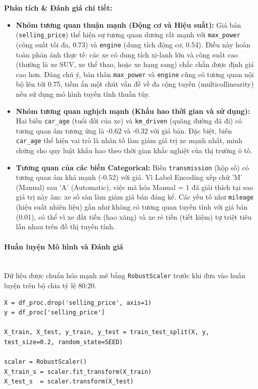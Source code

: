 \textbf{Phân tích \& Đánh giá chi tiết:}
\begin{itemize}
    \item \textbf{Nhóm tương quan thuận mạnh (Động cơ và Hiệu suất):} Giá bán (\texttt{selling\_price}) thể hiện sự tương quan dương rất mạnh với \texttt{max\_power} (công suất tối đa, 0.73) và \texttt{engine} (dung tích động cơ, 0.54). Điều này hoàn toàn phản ánh thực tế: các xe có dung tích xi-lanh lớn và công suất cao (thường là xe SUV, xe thể thao, hoặc xe hạng sang) chắc chắn được định giá cao hơn. Đáng chú ý, bản thân \texttt{max\_power} và \texttt{engine} cũng có tương quan nội bộ lên tới 0.75, tiềm ẩn một chút vấn đề về đa cộng tuyến (multicollinearity) nếu sử dụng mô hình tuyến tính thuần túy.
    \item \textbf{Nhóm tương quan nghịch mạnh (Khấu hao thời gian và sử dụng):} Hai biến \texttt{car\_age} (tuổi đời của xe) và \texttt{km\_driven} (quãng đường đã đi) có tương quan âm tương ứng là -0.62 và -0.32 với giá bán. Đặc biệt, biến \texttt{car\_age} thể hiện vai trò là nhân tố làm giảm giá trị xe mạnh nhất, minh chứng cho quy luật khấu hao theo thời gian khắc nghiệt của thị trường ô tô.
    \item \textbf{Tương quan của các biến Categorical:} Biến \texttt{transmission} (hộp số) có tương quan âm khá mạnh (-0.52) với giá. Vì Label Encoding xếp chữ 'M' (Manual) sau 'A' (Automatic), việc mã hóa Manual = 1 đã giải thích tại sao giá trị này âm: xe số sàn làm giảm giá bán đáng kể. Các yếu tố như \texttt{mileage} (hiệu suất nhiên liệu) gần như không có tương quan tuyến tính với giá bán (0.01), có thể vì xe đắt tiền (hao xăng) và xe rẻ tiền (tiết kiệm) tự triệt tiêu lẫn nhau trên đồ thị tuyến tính.
\end{itemize}

\paragraph{Huấn luyện Mô hình và Đánh giá} \hfill \\

Dữ liệu được chuẩn hóa mạnh mẽ bằng \texttt{RobustScaler} trước khi đưa vào huấn luyện trên bộ chia tỷ lệ 80:20.

\begin{lstlisting}[style=pythoncode, caption={Chuẩn hóa RobustScaler và phân chia tập dữ liệu}]
X = df_proc.drop('selling_price', axis=1)
y = df_proc['selling_price']

X_train, X_test, y_train, y_test = train_test_split(X, y, test_size=0.2, random_state=SEED)

scaler = RobustScaler()
X_train_s = scaler.fit_transform(X_train)
X_test_s  = scaler.transform(X_test)
\end{lstlisting}

